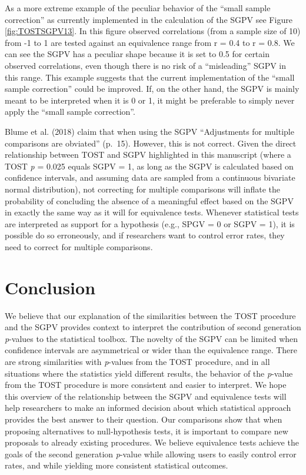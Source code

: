 \documentclass[,man,floatsintext]{apa6}
\begin{document}
As a more extreme example of the peculiar behavior of the \enquote{small
sample correction} as currently implemented in the calculation of the
SGPV see Figure \ref{fig:TOSTSGPV13}. In this figure observed
correlations (from a sample size of 10) from -1 to 1 are tested against
an equivalence range from r = 0.4 to r = 0.8. We can see the SGPV has a
peculiar shape because it is set to 0.5 for certain observed
correlations, even though there is no risk of a \enquote{misleading}
SGPV in this range. This example suggests that the current
implementation of the \enquote{small sample correction} could be
improved. If, on the other hand, the SGPV is mainly meant to be
interpreted when it is 0 or 1, it might be preferable to simply never
apply the \enquote{small sample correction}.

Blume et al. (2018) claim that when using the SGPV \enquote{Adjustments
for multiple comparisons are obviated} (p.~15). However, this is not
correct. Given the direct relationship between TOST and SGPV highlighted
in this manuscript (where a TOST \emph{p} = 0.025 equals SGPV = 1, as
long as the SGPV is calculated based on confidence intervals, and
assuming data are sampled from a continuous bivariate normal
distribution), not correcting for multiple comparisons will inflate the
probability of concluding the absence of a meaningful effect based on
the SGPV in exactly the same way as it will for equivalence tests.
Whenever statistical tests are interpreted as support for a hypothesis
(e.g., SPGV = 0 or SGPV = 1), it is possible do so erroneously, and if
researchers want to control error rates, they need to correct for
multiple comparisons.

\section{Conclusion}\label{conclusion}

We believe that our explanation of the similarities between the TOST
procedure and the SGPV provides context to interpret the contribution of
second generation \emph{p}-values to the statistical toolbox. The
novelty of the SGPV can be limited when confidence intervals are
asymmetrical or wider than the equivalence range. There are strong
similarities with \emph{p}-values from the TOST procedure, and in all
situations where the statistics yield different results, the behavior of
the \emph{p}-value from the TOST procedure is more consistent and easier
to interpret. We hope this overview of the relationship between the SGPV
and equivalence tests will help researchers to make an informed decision
about which statistical approach provides the best answer to their
question. Our comparisons show that when proposing alternatives to
null-hypothesis tests, it is important to compare new proposals to
already existing procedures. We believe equivalence tests achieve the
goals of the second generation \emph{p}-value while allowing users to
easily control error rates, and while yielding more consistent
statistical outcomes.
\end{document}
